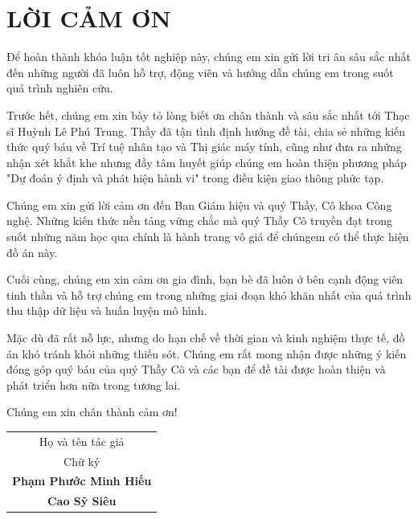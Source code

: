 \section*{LỜI CẢM ƠN}	
	
	Để hoàn thành khóa luận tốt nghiệp này, chúng em xin gửi lời tri ân sâu sắc nhất đến những người đã luôn hỗ trợ, động viên và hướng dẫn chúng em trong suốt quá trình nghiên cứu.
	
	Trước hết, chúng em xin bày tỏ lòng biết ơn chân thành và sâu sắc nhất tới Thạc sĩ Huỳnh Lê Phú Trung. Thầy đã tận tình định hướng đề tài, chia sẻ những kiến thức quý báu về Trí tuệ nhân tạo và Thị giác máy tính, cũng như đưa ra những nhận xét khắt khe nhưng đầy tâm huyết giúp chúng em hoàn thiện phương pháp "Dự đoán ý định và phát hiện hành vi" trong điều kiện giao thông phức tạp.
	
	Chúng em xin gửi lời cảm ơn đến Ban Giám hiệu và quý Thầy, Cô khoa Công nghệ. Những kiến thức nền tảng vững chắc mà quý Thầy Cô truyền đạt trong suốt những năm học qua chính là hành trang vô giá để chúngem có thể thực hiện đồ án này.
	
	Cuối cùng, chúng em xin cảm ơn gia đình, bạn bè đã luôn ở bên cạnh động viên tinh thần và hỗ trợ chúng em trong những giai đoạn khó khăn nhất của quá trình thu thập dữ liệu và huấn luyện mô hình.
	
	Mặc dù đã rất nỗ lực, nhưng do hạn chế về thời gian và kinh nghiệm thực tế, đồ án khó tránh khỏi những thiếu sót. Chúng em rất mong nhận được những ý kiến đóng góp quý báu của quý Thầy Cô và các bạn để đề tài được hoàn thiện và phát triển hơn nữa trong tương lai.
	
	Chúng em xin chân thành cảm ơn!
	
	\vspace{1cm}
	
	\begin{flushright}
		\begin{tabular}{c}
			\textnormal{Họ và tên tác giả} \\
			\textnormal{Chữ ký} \\[2.5cm]
			\textbf{Phạm Phước Minh Hiếu} \\[2.5cm]
			\textbf{Cao Sỹ Siêu}
		\end{tabular}
	\end{flushright}